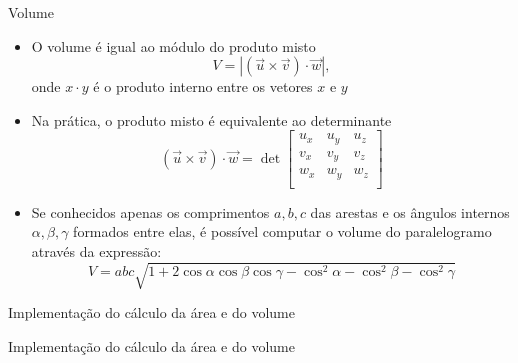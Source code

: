 \begin{frame}[fragile]{Volume}

    \begin{itemize}
        \item O volume é igual ao módulo do produto misto 
        \[
            V = |(\vec{u} \times \vec{v}) \cdot \vec{w}|,
        \]
        onde $x\cdot y$ é o produto interno entre os vetores $x$ e $y$
        \pause

        \item Na prática, o produto misto é equivalente ao determinante 
        \[
            (\vec{u} \times \vec{v}) \cdot \vec{w}
            = \det \begin{bmatrix}
                u_x & u_y & u_z \\
                v_x & v_y & v_z \\
                w_x & w_y & w_z \\
            \end{bmatrix}
        \]
        \pause

        \item Se conhecidos apenas os comprimentos $a, b, c$ das arestas e os ângulos internos
            $\alpha, \beta, \gamma$ formados entre elas, é possível computar o volume do paralelogramo
                através da expressão:
            \[
                V = abc\sqrt{1 + 2\cos \alpha \cos \beta \cos \gamma - \cos^2 \alpha - \cos^2 \beta - \cos^2 \gamma}
            \]

    \end{itemize}

\end{frame}

\begin{frame}[fragile]{Implementação do cálculo da área e do volume}
\end{frame}

\begin{frame}[fragile]{Implementação do cálculo da área e do volume}
\end{frame}
